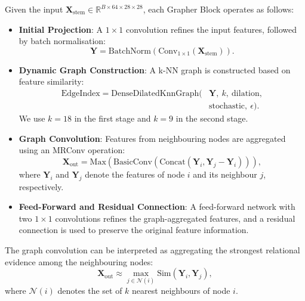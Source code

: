 \documentclass[10pt,journal,compsoc]{IEEEtran}
\begin{document}
Given the input \(\bm{X}_{\text{stem}} \in \mathbb{R}^{B \times 64 \times 28 \times 28}\), each Grapher Block operates as follows:
\begin{itemize}
    \item \textbf{Initial Projection}: A \(1 \times 1\) convolution refines the input features, followed by batch normalisation:
    \begin{equation}
        \bm{Y} = \mathrm{BatchNorm}(\mathrm{Conv}_{1 \times 1}(\bm{X}_{\text{stem}})).
    \end{equation}

    \item \textbf{Dynamic Graph Construction}: A k-NN graph is constructed based on feature similarity:
    \begin{equation}
    \begin{aligned}
    \mathrm{EdgeIndex} = \mathrm{DenseDilatedKnnGraph}(&\bm{Y},\ k,\ \text{dilation}, \\
                                                  &\text{stochastic},\ \epsilon).
    \end{aligned}
    \end{equation}
    We use \(k=18\) in the first stage and \(k=9\) in the second stage.

    \item \textbf{Graph Convolution}: Features from neighbouring nodes are aggregated using an MRConv operation:
    \begin{equation}
        \bm{X}_{\text{out}} = \mathrm{Max}(\mathrm{BasicConv}(\mathrm{Concat}(\bm{Y}_i, \bm{Y}_j - \bm{Y}_i))),
    \end{equation}
    where \(\bm{Y}_i\) and \(\bm{Y}_j\) denote the features of node \(i\) and its neighbour \(j\), respectively.

    \item \textbf{Feed-Forward and Residual Connection}: A feed-forward network with two \(1 \times 1\) convolutions refines the graph-aggregated features, and a residual connection is used to preserve the original feature information.
\end{itemize}

The graph convolution can be interpreted as aggregating the strongest relational evidence among the neighbouring nodes:
\begin{equation}
    \bm{X}_{\text{out}} \approx \max_{j \in \mathcal{N}(i)} \mathrm{Sim}(\bm{Y}_i, \bm{Y}_j),
\end{equation}
where \(\mathcal{N}(i)\) denotes the set of \(k\) nearest neighbours of node \(i\).
\end{document}
